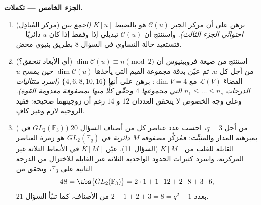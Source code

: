 \begin{problem}
\medskip
\noindent\textbf{الجزء الخامس --- تكملات.}
\begin{enumerate}[resume]
  \item (مركز المُبادِل) برهن على أن مركز الجبر $\mathcal C(u)$
        هو بالضبط $K[u]$ \emph{(اجمع بين احتوائَي الجزء الثالث)}.
        واستنتج أن $\mathcal C(u)$ تبديلي إذا وفقط إذا كان $u$
        دائريًا --- فتستعيد حالة التساوي في السؤال 8 بطريق بنيوي
        محض.
  \item (أي الأبعاد تتحقق؟) استنتج من صيغة فروبينيوس أن $\dim\mathcal C(u) \equiv n \pmod 2$
        من أجل كل $u$. ثم عيّن بدقة مجموعة القيم التي يأخذها
        $\dim \mathcal C(u)$ حين يمسح $u$ الفضاءَ $\mathcal L(V)$ مع
        $\dim V = 4$: برهن على أنها $\{4, 6,
        8, 10, 16\}$ \emph{(اسرد متتاليات
        الدرجات $n_1
        \leq \dots \leq n_s$ التي مجموعها $4$ وحقّق كلًّا منها بمصفوفة
        معدومة القوة)}. وعلى وجه الخصوص لا يتحقق العددان $12$
        و $14$ رغم أن زوجيتهما صحيحة: فقيد الزوجية لازم وغير
        كافٍ.
  \item ( في $GL_2(\mathbb F_3)$) من أجل $q = 3$، احسب عدد
        عناصر كل  من أصناف السؤال 20 بمبرهنة المدار
        والمثبِّت: فمُرَكِّز مصفوفة $M$ \emph{دائرية} في $GL_2(\mathbb F_q)$
        هو زمرة العناصر القابلة للقلب من $K[M]$ (السؤال 11).
        عيّن $K[M]$ في الأنماط الثلاثة غير المركزية، واسرد
        كثيرات الحدود الواحدية الثلاثة غير القابلة للاختزال من
        الدرجة الثانية على $\mathbb F_3$، وتحقق من 
        \[
        48 = \abs{GL_2(\mathbb F_3)}
        = 2\cdot1 + 1\cdot12 + 2\cdot8 + 3\cdot6,
        \]
        بعدد $2 + 1 + 2 + 3 = 8 = q^2 - 1$ من الأصناف، كما تنبّأ السؤال 21.
\end{enumerate}
\end{problem}
